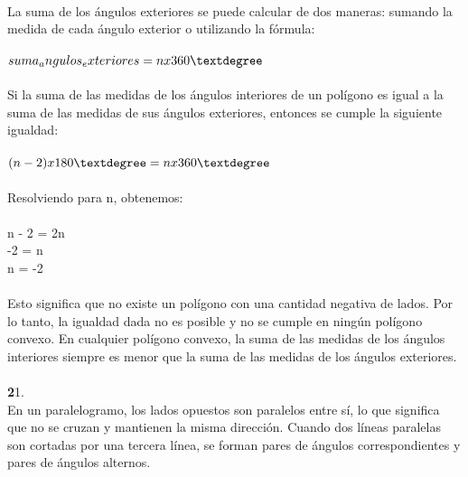 \documentclass{article}
\begin{document}
\\
La suma de los ángulos exteriores se puede calcular de dos maneras: sumando la medida de cada ángulo exterior o utilizando la fórmula:\\
\\
$suma_angulos_exteriores = n x 360\textdegree$\\
\\
Si la suma de las medidas de los ángulos interiores de un polígono es igual a la suma de las medidas de sus ángulos exteriores, entonces se cumple la siguiente igualdad:\\
\\
$(n - 2) x 180\textdegree = n x 360\textdegree$\\
\\
Resolviendo para n, obtenemos:\\
\\
n - 2 = 2n\\
-2 = n\\
n = -2\\
\\
Esto significa que no existe un polígono con una cantidad negativa de lados. Por lo tanto, la igualdad dada no es posible y no se cumple en ningún polígono convexo. En cualquier polígono convexo, la suma de las medidas de los ángulos interiores siempre es menor que la suma de las medidas de los ángulos exteriores.\\
\\
{\textbf 21. }\\
En un paralelogramo, los lados opuestos son paralelos entre sí, lo que significa que no se cruzan y mantienen la misma dirección. Cuando dos líneas paralelas son cortadas por una tercera línea, se forman pares de ángulos correspondientes y pares de ángulos alternos.
\end{document}
